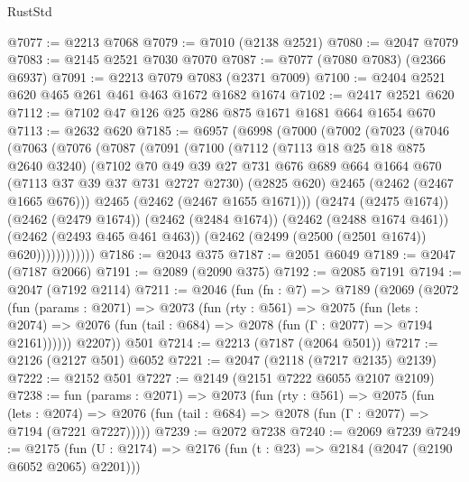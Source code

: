 \begin{lexlean}{RustStd}
\begin{coremodule}
@7077 := @2213 @7068
@7079 := @7010 (@2138 @2521)
@7080 := @2047 @7079
@7083 := @2145 @2521 @7030 @7070
@7087 := @7077 (@7080 @7083) (@2366 @6937)
@7091 := @2213 @7079 @7083 (@2371 @7009)
@7100 := @2404 @2521 @620 @465 @261 @461 @463 @1672 @1682 @1674
@7102 := @2417 @2521 @620
@7112 := @7102 @47 @126 @25 @286 @875 @1671 @1681 @664 @1654 @670
@7113 := @2632 @620
@7185 := @6957
    (@6998
      (@7000
        (@7002
          (@7023
            (@7046
              (@7063
                (@7076
                  (@7087
                    (@7091
                      (@7100
                        (@7112
                          (@7113 @18 @25 @18 @875 @2640 @3240)
                          (@7102
                            @70
                            @49
                            @39
                            @27
                            @731
                            @676
                            @689
                            @664
                            @1664
                            @670
                            (@7113 @37 @39 @37 @731 @2727 @2730)
                            (@2825 @620)
                            @2465
                            (@2462 (@2467 @1665 @676)))
                          @2465
                          (@2462 (@2467 @1655 @1671)))
                        (@2474 (@2475 @1674))
                        (@2462 (@2479 @1674))
                        (@2462 (@2484 @1674))
                        (@2462 (@2488 @1674 @461))
                        (@2462 (@2493 @465 @461 @463))
                        (@2462 (@2499 (@2500 (@2501 @1674)) @620))))))))))))
@7186 := @2043 @375
@7187 := @2051 @6049
@7189 := @2047 (@7187 @2066)
@7191 := @2089 (@2090 @375)
@7192 := @2085 @7191
@7194 := @2047 (@7192 @2114)
@7211 := @2046
    (fun (fn : @7) =>
    @7189
      (@2069
        (@2072
          (fun (params : @2071) =>
          @2073
            (fun (rty : @561) =>
            @2075
              (fun (lets : @2074) =>
              @2076 (fun (tail : @684) => @2078 (fun (Γ : @2077) => @7194 @2161))))))
        @2207))
    @501
@7214 := @2213 (@7187 (@2064 @501))
@7217 := @2126 (@2127 @501) @6052
@7221 := @2047 (@2118 (@7217 @2135) @2139)
@7222 := @2152 @501
@7227 := @2149 (@2151 @7222 @6055 @2107 @2109)
@7238 := fun (params : @2071) =>
  @2073
    (fun (rty : @561) =>
    @2075
      (fun (lets : @2074) =>
      @2076 (fun (tail : @684) => @2078 (fun (Γ : @2077) => @7194 (@7221 @7227)))))
@7239 := @2072 @7238
@7240 := @2069 @7239
@7249 := @2175 (fun (U : @2174) => @2176 (fun (t : @23) => @2184 (@2047 (@2190 @6052 @2065) @2201)))

\end{coremodule}
\end{lexlean}
